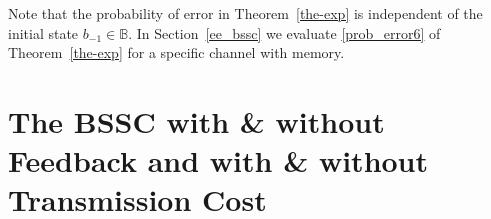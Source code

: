 \documentclass[11pt, a4paper, journal,onecolumn]{IEEEtran}
\newcommand{\mb}{\mathbb}
\newcommand{\ben}{\begin{enumerate}}
\newcommand{\een}{\end{enumerate}}
\newcommand{\argmax}{\arg\!\max}
\newcommand{\noi}{\noindent}
\begin{document}
%
%
%
%
Note that the probability of error in Theorem~\ref{the-exp} is independent of the initial state $b_{-1} \in {\mb B}$.  In Section~\ref{ee_bssc} we evaluate \eqref{prob_error6} of Theorem~\ref{the-exp} for a specific channel with memory. 


\section{The BSSC with \& without Feedback and with \& without Transmission Cost}
\label{cabistsych}
\end{document}

